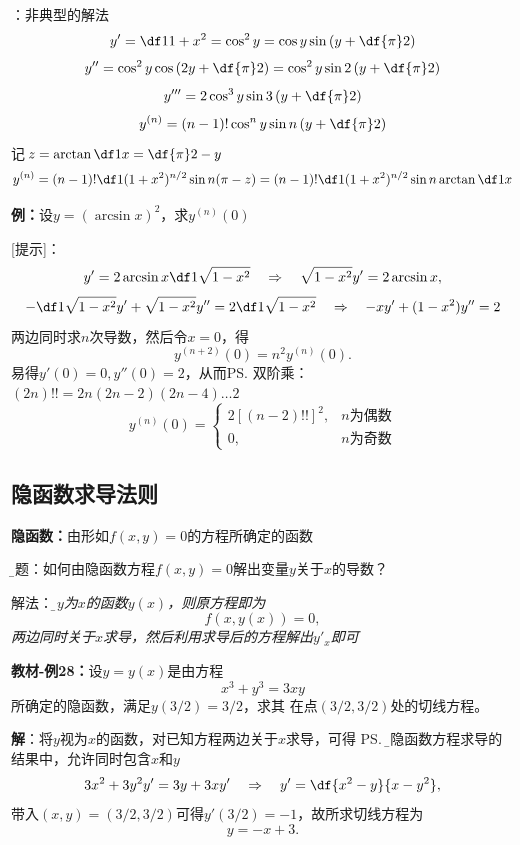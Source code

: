 \begin{shaded}
[提示]：非典型的解法
$$y'=\df1{1+x^2}=\cos^2y=\cos y\sin\left(y+\df{\pi}2\right)$$
$$y''=\cos^2y\cos\left(2y+\df{\pi}2\right)=\cos^2y\sin2\left(y+\df{\pi}2\right)$$
$$y'''=2\cos^3y\sin3\left(y+\df{\pi}2\right)$$
$$y^{(n)}=(n-1)!\cos^ny\sin n\left(y+\df{\pi}2\right)$$
记$z=\arctan\df1x=\df{\pi}2-y$
$$y^{(n)}=(n-1)!\df1{(1+x^2)^{n/2}}\sin n(\pi-z)=
(n-1)!\df1{(1+x^2)^{n/2}}\sin n\arctan\df1x$$
\end{shaded}

{\bf 例：}设$y=(\arcsin x)^2$，求$y^{(n)}(0)$

[提示]：
$$y'=2\arcsin x\df1{\sqrt{1-x^2}}\quad
\Rightarrow\quad \sqrt{1-x^2}y'=2\arcsin x,$$
$$-\df1{\sqrt{1-x^2}}y'+\sqrt{1-x^2}y''=2\df1{\sqrt{1-x^2}}\quad
\Rightarrow\quad-xy'+(1-x^2)y''=2$$
两边同时求$n$次导数，然后令$x=0$，得
$$y^{(n+2)}(0)=n^2y^{(n)}(0).$$
易得$y'(0)=0,y''(0)=2$，从而\ps{双阶乘：$(2n)!!=2n(2n-2)(2n-4)\ldots2$}
$$y^{(n)}(0)=\left\{\begin{array}{ll}
2[(n-2)!!]^2,& n\mbox{为偶数}\\
0,& n\mbox{为奇数}
\end{array}\right.$$

\subsection{隐函数求导法则}

{\bf 隐函数：}由形如$f(x,y)=0$的方程所确定的函数

{\b 问题：}如何由隐函数方程$f(x,y)=0$解出变量$y$关于$x$的导数？

解法：{\it\b 视$y$为$x$的函数$y(x)$，则原方程即为
$$f(x,y(x))=0,$$
两边同时关于$x$求导，然后利用求导后的方程解出$y'_x$即可
}

{\bf 教材-例28：}设$y=y(x)$是由方程
$$x^3+y^3=3xy$$
所确定的隐函数，满足$y(3/2)=3/2$，求其
在点$(3/2,3/2)$处的切线方程。

{\bf 解}：将$y$视为$x$的函数，对已知方程两边关于$x$求导，可得
\ps{\b 在隐函数方程求导的结果中，允许同时包含$x$和$y$}
$$3x^2+3y^2y'=3y+3xy'\quad\Rightarrow\quad
y'=\df{x^2-y}{x-y^2},$$
带入$(x,y)=(3/2,3/2)$可得$y'(3/2)=-1$，故所求切线方程为
$$y=-x+3.$$

\begin{center}
\end{center}

